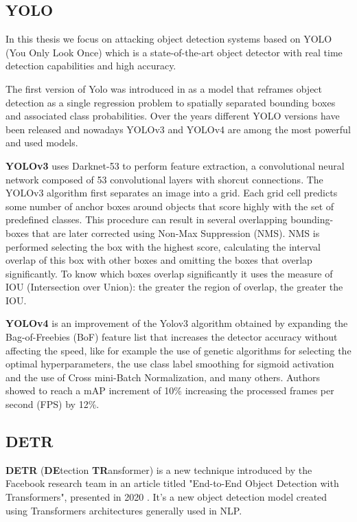\subsection{YOLO}
 
In this thesis we focus on attacking object detection systems based on YOLO (You Only Look Once) which is a state-of-the-art object detector with real time detection capabilities and high accuracy. 

The first version of Yolo was introduced in \cite{redmon2016you} as a model that reframes object detection as a single regression problem to spatially separated bounding boxes and associated class probabilities. 
Over the years different YOLO versions have been released and nowadays YOLOv3 and YOLOv4 are among the most powerful and used models.

\textbf{YOLOv3} uses Darknet-53 to perform feature extraction, %
a convolutional neural network composed of 53 convolutional layers with shorcut connections.
The YOLOv3 algorithm first separates an image into a grid. 
Each grid cell predicts some number of anchor boxes around objects that score highly with the set of predefined classes.
This procedure can result in several overlapping bounding-boxes that are later corrected using Non-Max Suppression (NMS).
NMS is performed selecting the box with the highest score, calculating the interval overlap of this box with other boxes and omitting the boxes that overlap significantly.
To know which boxes overlap significantly it uses the measure of IOU (Intersection over Union): the greater the region of overlap, the greater the IOU.

\textbf{YOLOv4} is an improvement of the Yolov3 algorithm obtained by expanding the  Bag-of-Freebies (BoF) feature list that increases the detector accuracy without affecting the speed, like for example the use of genetic algorithms for
selecting the optimal hyperparameters, the use class label smoothing for sigmoid activation and the use of Cross mini-Batch Normalization, and many others. Authors showed to reach a mAP increment of 10\% increasing the processed  frames per second (FPS) by 12\%.

\subsection{DETR}
\textbf{DETR} (\textbf{DE}tection \textbf{TR}ansformer) is a new technique introduced by the Facebook research team in an article titled "End-to-End Object Detection with Transformers", presented in 2020 \cite{detr_paper}.
It’s a new object detection model created using Transformers architectures generally used in NLP.\\


